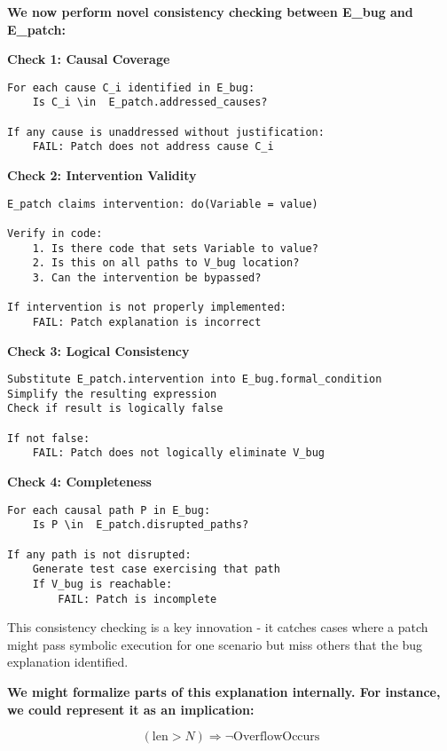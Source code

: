 \documentclass[conference,compsoc]{IEEEtran}
\begin{document}
\textbf{We now perform novel consistency checking between E\_bug and
E\_patch:}

\textbf{Check 1: Causal Coverage}

\begin{verbatim}
For each cause C_i identified in E_bug:
    Is C_i \in  E_patch.addressed_causes?
    
If any cause is unaddressed without justification:
    FAIL: Patch does not address cause C_i
\end{verbatim}

\textbf{Check 2: Intervention Validity}

\begin{verbatim}
E_patch claims intervention: do(Variable = value)

Verify in code:
    1. Is there code that sets Variable to value?
    2. Is this on all paths to V_bug location?
    3. Can the intervention be bypassed?

If intervention is not properly implemented:
    FAIL: Patch explanation is incorrect
\end{verbatim}

\textbf{Check 3: Logical Consistency}

\begin{verbatim}
Substitute E_patch.intervention into E_bug.formal_condition
Simplify the resulting expression
Check if result is logically false

If not false:
    FAIL: Patch does not logically eliminate V_bug
\end{verbatim}

\textbf{Check 4: Completeness}

\begin{verbatim}
For each causal path P in E_bug:
    Is P \in  E_patch.disrupted_paths?
    
If any path is not disrupted:
    Generate test case exercising that path
    If V_bug is reachable:
        FAIL: Patch is incomplete
\end{verbatim}

This consistency checking is a key innovation - it catches cases where a
patch might pass symbolic execution for one scenario but miss others
that the bug explanation identified.

\textbf{We might formalize parts of this explanation internally. For
instance, we could represent it as an implication:}

\[
(\text{len} > N) \Rightarrow \lnot \text{OverflowOccurs}
\]
\end{document}
